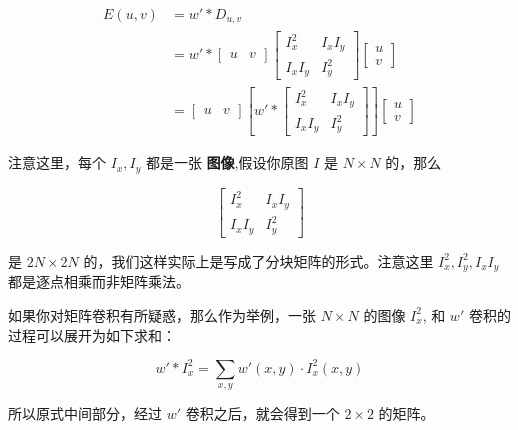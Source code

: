 \begin{equation}
    \begin{aligned}
    E(u,v)
    &= w' * D_{u,v}\\
    &= w' \ast \begin{bmatrix} u & v \end{bmatrix} \begin{bmatrix} I_x^2 & I_xI_y \\ I_xI_y & I_y^2 \end{bmatrix} \begin{bmatrix} u \\ v \end{bmatrix}\\
    &= \begin{bmatrix}
        u & v
        \end{bmatrix}
        \left[
        w' *
        \begin{bmatrix}
        I_x^2 & I_x I_y \\
        I_x I_y & I_y^2
        \end{bmatrix}
        \right]
        \begin{bmatrix}
        u \\
        v
        \end{bmatrix}
    \end{aligned}
\end{equation}

注意这里，每个 $I_x, I_y$ 都是一张 \textbf{图像},假设你原图 $I$ 是 $N \times N$ 的，那么

$$
\begin{bmatrix}
    I_x^2 & I_x I_y \\
    I_x I_y & I_y^2
\end{bmatrix}
$$

是 $2N \times 2N$ 的，我们这样实际上是写成了分块矩阵的形式。注意这里 $I_x^2, I_y^2, I_xI_y$ 都是逐点相乘而非矩阵乘法。

如果你对矩阵卷积有所疑惑，那么作为举例，一张 $N \times N$ 的图像 $I_x^2$, 和 $w'$ 卷积的过程可以展开为如下求和：

\begin{equation}
    w' * I_x^2 = \sum_{x, y} w'(x, y) \cdot I_x^2(x, y)
\end{equation}

所以原式中间部分，经过 $w'$ 卷积之后，就会得到一个 $2 \times 2$ 的矩阵。

